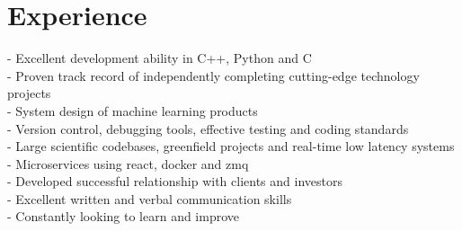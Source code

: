 \documentclass[print]{friggeri-cv} %
\begin{document}
\section{Experience}
- Excellent development ability in C++, Python and C\\
- Proven track record of independently completing cutting-edge technology projects\\
- System design of machine learning products\\
- Version control, debugging tools, effective testing and coding standards\\
- Large scientific codebases, greenfield projects and real-time low latency systems\\
- Microservices using react, docker and zmq\\
- Developed successful relationship with clients and investors\\
- Excellent written and verbal communication skills\\
- Constantly looking to learn and improve\\

\end{document}
